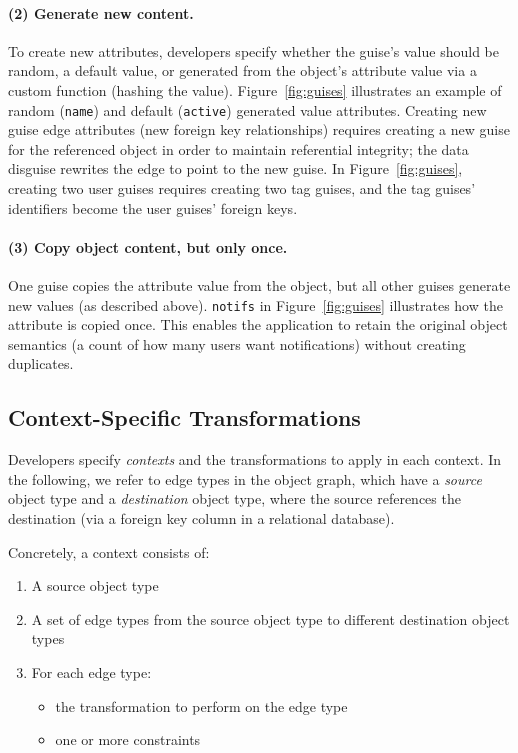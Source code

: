 \paragraph{(2) Generate new content.}
To create new attributes, developers specify whether the guise's value should be random,
a default value, or generated from the object's attribute value via a custom function (\eg hashing 
the value).
%
Figure~\ref{fig:guises} illustrates an example of random (\texttt{name}) and default
(\texttt{active}) generated value attributes.
%
%
Creating new guise edge attributes (\eg new foreign key relationships) requires
creating a new guise for the referenced object in order to maintain referential
integrity;
the data disguise rewrites the edge to point to the new guise.
%
In Figure~\ref{fig:guises}, creating two user guises requires creating two
tag guises, and the tag guises' identifiers become the user guises' foreign keys.
%

\paragraph{(3) Copy object content, but only once.}
%
One guise copies the attribute value from the object, but all other guises generate new
values (as described above).
%
\texttt{notifs} in Figure~\ref{fig:guises} illustrates how the attribute is copied once.
%
This enables the application to retain the original object semantics (\eg a count of how many
users want notifications) without creating duplicates.
%

\subsection{Context-Specific Transformations}
\label{sec:context}

Developers specify \emph{contexts} and the transformations to apply in each context.
%
%
In the following, we refer to edge types in the object graph, which have a \emph{source} object type and a \emph{destination} object type,
where the source references the destination (\eg via a foreign key column in a relational database).

Concretely, a context consists of:
\begin{enumerate}[nosep]
    \item A source object type
    \item A set of edge types from the source object type to different destination object types
    \item For each edge type: 
        \begin{itemize}[nosep]
            \item the transformation to perform on the edge type
            \item one or more constraints 
        \end{itemize}
\end{enumerate}

